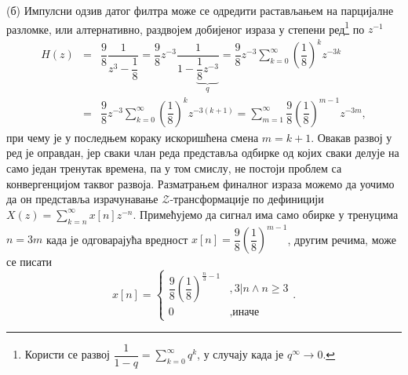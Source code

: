 (б) Импулсни одзив датог филтра може се одредити растављањем на парцијалне разломке, или алтернативно, 
раздвојем добијеног израза у степени ред\footnote{ Користи се развој
$\dfrac{1}{1 - q} = \sum_{k = 0}^\infty q^k$, у случају када је $q^\infty \to 0$. } по $z^{-1}$ 
\begin{eqnarray}
    H(z) &=& \dfrac{9}{8} \dfrac{1}{z^3 - \dfrac{1}{8}} =
           \dfrac{9}{8} z^{-3} \dfrac{1}{1 - \underbrace{\dfrac{1}{8}z^{-3}}_q }
         = \dfrac{9}{8} z^{-3} \sum_{k = 0}^{\infty} \left(\dfrac{1}{8}\right)^k z^{-3k} \\
         &=& \dfrac{9}{8} z^{-3} \sum_{k = 0}^{\infty} \left(\dfrac{1}{8}\right)^k z^{-3(k+1)} 
        =  \sum_{m = 1}^{\infty} \dfrac{9}{8}\left(\dfrac{1}{8}\right)^{m-1} z^{-3m},
\end{eqnarray}
при чему је у последњем кораку искоришћена смена $m = k + 1$. 
Овакав развој у ред је оправдан, јер сваки члан реда представља одбирке од којих сваки делује на само један тренутак времена, 
па у том смислу, не постоји проблем са конвергенцијом таквог развоја. Разматрањем финалног израза можемо да уочимо да 
он представља израчунавање $\mathcal{Z}$-трансформације по дефиницији 
$X(z) = \sum_{k = n}^{\infty} x[n] z^{-n}$. Примећујемо да сигнал има само обирке у тренуцима $n = 3m$ када је 
одговарајућа вредност $x[n] = \dfrac{9}{8}\left(\dfrac{1}{8}\right)^{m-1}$, другим речима, може се писати 
\begin{equation}
    x[n] = \begin{cases}
        \dfrac{9}{8}\left(\dfrac{1}{8}\right)^{\frac{n}{3}-1} &, 3|n \land n \geq 3 \\
        0 &, \text{иначе}
    \end{cases}.
\end{equation}
